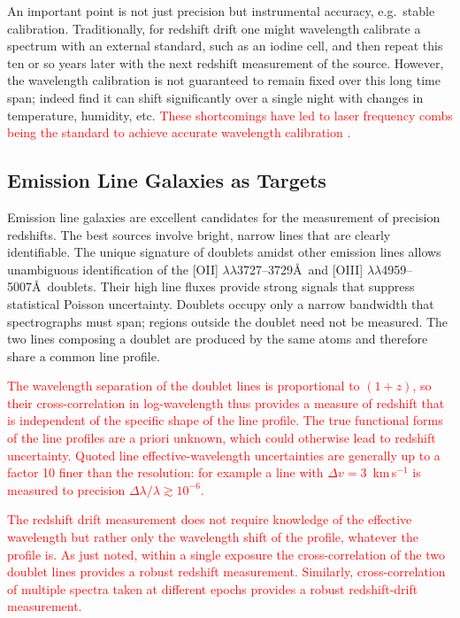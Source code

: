 \documentclass[preprint2, 10pt]{aastex}
\begin{document}
An important point is not just precision but instrumental accuracy, 
e.g.\ stable calibration. 
Traditionally, for redshift drift one might wavelength calibrate a spectrum with an external 
standard, such as an iodine cell, and then repeat this ten or so years 
later with the next redshift measurement of the source.  However, the 
wavelength calibration is not guaranteed to remain fixed over this long time 
span; indeed \citet{griest1,griest2} find it can shift significantly over a 
single night with changes in temperature, humidity, etc.  
\textcolor{red}{These shortcomings have led to 
laser frequency combs being the standard to achieve accurate wavelength calibration
\citep{2007MNRAS.380..839M,2008Sci...321.1335S,2012Natur.485..611W}.}

\subsection{Emission Line Galaxies as Targets} 

Emission line galaxies are excellent candidates for the measurement of 
precision redshifts. The best sources involve bright, narrow lines that 
are clearly identifiable. 
The unique signature
of doublets amidst  other emission lines allows unambiguous identification of the [OII] $\lambda\lambda$3727--3729\AA\ 
and [OIII] $\lambda\lambda$4959--5007\AA\ doublets.
Their high line fluxes provide strong signals that suppress statistical Poisson uncertainty.
Doublets occupy only a narrow bandwidth that spectrographs must span; 
regions outside the doublet need not be measured. 
The two lines composing a doublet are produced by the same atoms and therefore
share a common line profile.

\textcolor{red}{
The wavelength separation of the doublet lines is proportional to $(1+z)$, 
so their cross-correlation in log-wavelength
thus provides a measure of redshift that is independent of the specific shape of the line profile.
The true functional forms of the line profiles are a priori unknown, which 
could otherwise lead to redshift uncertainty.  Quoted line effective-wavelength uncertainties
are generally up to a factor 10 finer than the resolution: for example a line with $\Delta v=3$~km\,s$^{-1}$ is measured to
precision $\Delta \lambda/\lambda \gtrsim 10^{-6}$.
}

\textcolor{red}{
The redshift drift measurement does not require knowledge of the effective wavelength but rather only the wavelength shift
of the profile, whatever the profile is. 
As just noted, within a single exposure the cross-correlation of the two doublet lines provides a robust redshift measurement.
Similarly, cross-correlation of multiple spectra taken at different epochs provides a robust redshift-drift measurement. 
}
\end{document}
